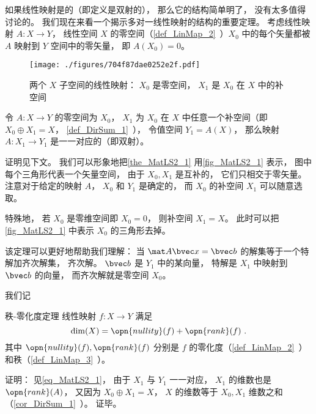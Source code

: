 
\begin{issues}
\issueTODO %
\end{issues}



如果线性映射是的（即定义是双射的）， 那么它的结构简单明了， 没有太多值得讨论的。 我们现在来看一个揭示多对一线性映射的结构的重要定理。 考虑线性映射 $A:X\to Y$， 线性空间 $X$ 的零空间（\autoref{def_LinMap_2}~）$X_0$ 中的每个矢量都被 $A$ 映射到 $Y$ 空间中的零矢量， 即 $A(X_0) = \qty{0}$。

\begin{figure}[ht]
\centering
\texttt{[image: ./figures/704f87dae0252e2f.pdf]}
\caption{两个 $X$ 子空间的线性映射： $X_0$ 是零空间， $X_1$ 是 $X_0$ 在 $X$ 中的补空间} \label{fig_MatLS2_1}
\end{figure}

\begin{theorem}{}\label{the_MatLS2_1}
令 $A:X \to Y$ 的零空间为 $X_0$， $X_1$ 为 $X_0$ 在 $X$ 中任意一个补空间（即 $X_0\oplus X_1 = X$， \autoref{def_DirSum_1}~）， 令值空间 $Y_1 = A(X)$， 那么映射 $A:X_1\to Y_1$ 是一一对应的（即双射）。
\end{theorem}
证明见下文。 我们可以形象地把\autoref{the_MatLS2_1} 用\autoref{fig_MatLS2_1} 表示， 图中每个三角形代表一个矢量空间， 由于 $X_0, X_1$ 是互补的， 它们只相交于零矢量。 注意对于给定的映射 $A$， $X_0$ 和 $Y_1$ 是确定的， 而 $X_0$ 的补空间 $X_1$ 可以随意选取。

特殊地， 若 $X_0$ 是零维空间即 $X_0 = \qty{0}$， 则补空间 $X_1 = X$。 此时可以把\autoref{fig_MatLS2_1} 中表示 $X_0$ 的三角形去掉。

该定理可以更好地帮助我们理解： 当 $\mat A \bvec x = \bvec b$ 的解集等于一个特解加齐次解集， 齐次解。 $\bvec b$ 是 $Y_1$ 中的某向量， 特解是 $X_1$ 中映射到 $\bvec b$ 的向量， 而齐次解就是零空间 $X_0$。

我们记

\begin{corollary}{秩-零化度定理}\label{cor_MatLS2_1}
线性映射 $f: X \to Y$ 满足
\begin{equation}\label{eq_MatLS2_1}
\dim(X) = \opn{nullity}(f) + \opn{rank}(f)~.
\end{equation}
其中 $\opn{nullity}(f), \opn{rank}(f)$ 分别是 $f$ 的零化度（\autoref{def_LinMap_2}~）和秩（\autoref{def_LinMap_3}~）。
\end{corollary}
证明： 见\autoref{eq_MatLS2_1}， 由于 $X_1$ 与 $Y_1$ 一一对应， $X_1$ 的维数也是 $\opn{rank}(A)$， 又因为 $X_0\oplus X_1 = X$， $X$ 的维数等于 $X_0, X_1$ 维数之和（\autoref{cor_DirSum_1}~）。 证毕。

